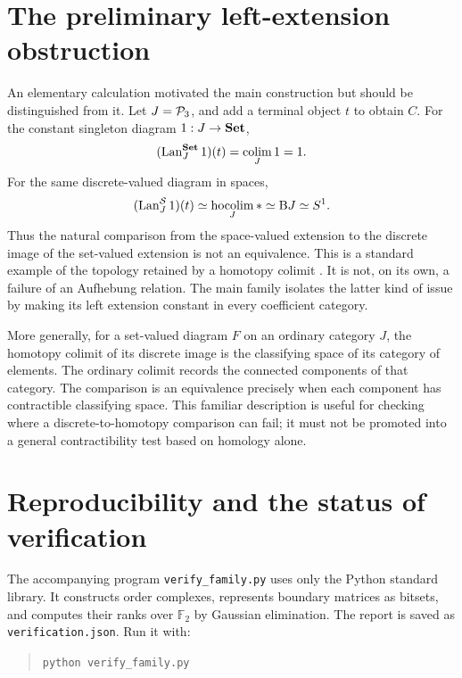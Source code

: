 \section{The preliminary left-extension obstruction}
\label{app:left}

An elementary calculation motivated the main construction but should be
distinguished from it. Let $J=\mathcal P_3$, and add a terminal object $t$ to
obtain $C$. For the constant singleton diagram $1:J\to\mathbf{Set}$,
\[
(\operatorname{Lan}_J^{\mathbf{Set}}1)(t)=\operatorname*{colim}_J 1=1.
\]
For the same discrete-valued diagram in spaces,
\[
(\operatorname{Lan}_J^{\mathcal S}1)(t)\simeq\operatorname*{hocolim}_J *\simeq\mathrm B J\simeq S^1.
\]
Thus the natural comparison from the space-valued extension to the
discrete image of the set-valued extension is not an equivalence.
This is a standard example of the topology retained by a homotopy
colimit \cite{Dugger}. It is not, on its own, a failure of an
Aufhebung relation. The main family isolates the latter kind of issue
by making its left extension constant in every coefficient category.

More generally, for a set-valued diagram $F$ on an ordinary category $J$,
the homotopy colimit of its discrete image is the classifying space of
its category of elements. The ordinary colimit records the connected
components of that category. The comparison is an equivalence precisely
when each component has contractible classifying space. This familiar
description is useful for checking where a discrete-to-homotopy comparison
can fail; it must not be promoted into a general contractibility test
based on homology alone.

\section{Reproducibility and the status of verification}
\label{app:verification}

The accompanying program \texttt{verify\_family.py} uses only the Python
standard library. It constructs order complexes, represents boundary
matrices as bitsets, and computes their ranks over $\mathbb F_2$ by
Gaussian elimination. The report is saved as
\texttt{verification.json}. Run it with:
\begin{quote}
\texttt{python verify\_family.py}
\end{quote}

